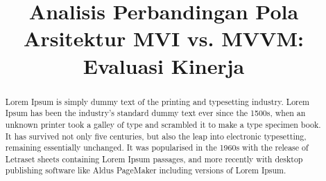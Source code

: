 \documentclass[conference]{IEEEtran}
\begin{document}
\title{Analisis Perbandingan Pola Arsitektur MVI vs. MVVM: Evaluasi Kinerja\\
}

\author{

\and
{}

\and
{}

\and
{}

\and
{}

}

\maketitle

\begin{abstract}
Lorem Ipsum is simply dummy text of the printing and typesetting industry. Lorem Ipsum has been the industry's standard dummy text ever since the 1500s, when an unknown printer took a galley of type and scrambled it to make a type specimen book. It has survived not only five centuries, but also the leap into electronic typesetting, remaining essentially unchanged. It was popularised in the 1960s with the release of Letraset sheets containing Lorem Ipsum passages, and more recently with desktop publishing software like Aldus PageMaker including versions of Lorem Ipsum.
\end{abstract}
\end{document}
